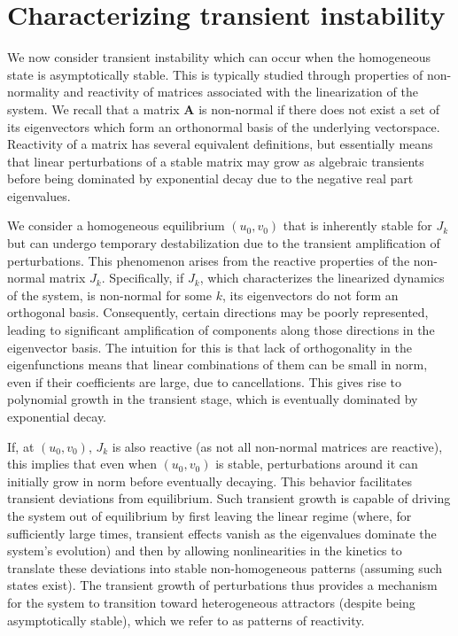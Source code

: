 \documentclass{article}
\newcommand{\jac}{J_{k}}
\begin{document}
{\section{Characterizing transient instability}\label{Sec_characterizing}
{We now consider transient instability which can occur when the homogeneous state is asymptotically stable. This is typically studied through properties of non-normality and reactivity of matrices associated with the linearization of the system. We recall that a matrix $\mathbf{A}$ is non-normal if there does not exist a set of its eigenvectors which form an orthonormal basis of the underlying vectorspace. Reactivity of a matrix has several equivalent definitions, but essentially means that linear perturbations of a stable matrix may grow as algebraic transients before being dominated by exponential decay due to the negative real part eigenvalues.} 
} 

We consider a homogeneous equilibrium \((u_0, v_0)\) that is inherently stable for \(\jac\) but can undergo temporary destabilization due to the transient amplification of perturbations. This phenomenon arises from the reactive properties of the non-normal matrix \(\jac\). Specifically, if \(\jac\), which characterizes the linearized dynamics of the system, is non-normal for some \(k\), its eigenvectors do not form an orthogonal basis. Consequently, certain directions may be poorly represented, leading to significant amplification of components along those directions in the eigenvector basis. {The intuition for this is that lack of orthogonality in the eigenfunctions means that linear combinations of them can be small in norm, even if their coefficients are large, due to cancellations. This gives rise to polynomial growth in the transient stage, which is eventually dominated by exponential decay. } 

If, at \((u_0, v_0)\), \(\jac\) is also reactive (as not all non-normal matrices are reactive), this implies that even when \((u_0, v_0)\) is stable, perturbations around it can initially grow in norm before eventually decaying. This behavior facilitates transient deviations from equilibrium. Such transient growth is capable of driving the system out of equilibrium by first leaving the linear regime (where, for sufficiently large times, transient effects vanish as the eigenvalues dominate the system's evolution) and then by allowing nonlinearities in the kinetics to translate these deviations into stable non-homogeneous patterns {(assuming such states exist)}. The transient growth of perturbations thus provides a mechanism for the system to transition toward heterogeneous attractors (despite being asymptotically stable), which we refer to as patterns of reactivity.
\end{document}
